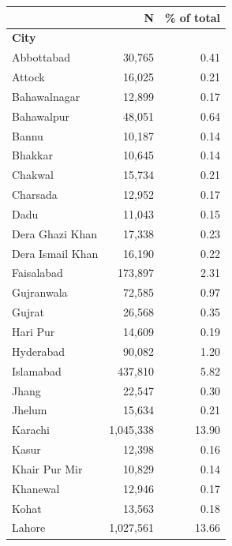 \begin{tabular}{lrr}


\toprule


 & N & \% of total \\


\midrule


\multicolumn{3}{l}{\textbf{City}}\\ 
\midrule
Abbottabad          &      30,765&        0.41\\
Attock              &      16,025&        0.21\\
Bahawalnagar        &      12,899&        0.17\\
Bahawalpur          &      48,051&        0.64\\
Bannu               &      10,187&        0.14\\
Bhakkar             &      10,645&        0.14\\
Chakwal             &      15,734&        0.21\\
Charsada            &      12,952&        0.17\\
Dadu                &      11,043&        0.15\\
Dera Ghazi Khan     &      17,338&        0.23\\
Dera Ismail Khan    &      16,190&        0.22\\
Faisalabad          &     173,897&        2.31\\
Gujranwala          &      72,585&        0.97\\
Gujrat              &      26,568&        0.35\\
Hari Pur            &      14,609&        0.19\\
Hyderabad           &      90,082&        1.20\\
Islamabad           &     437,810&        5.82\\
Jhang               &      22,547&        0.30\\
Jhelum              &      15,634&        0.21\\
Karachi             &   1,045,338&       13.90\\
Kasur               &      12,398&        0.16\\
Khair Pur Mir       &      10,829&        0.14\\
Khanewal            &      12,946&        0.17\\
Kohat               &      13,563&        0.18\\
Lahore              &   1,027,561&       13.66\\

\end{tabular}
